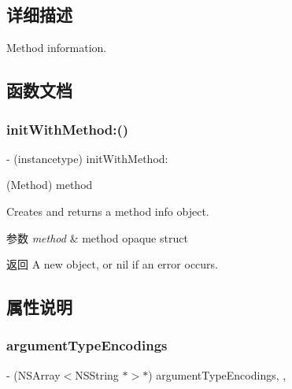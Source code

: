 \subsection{详细描述}
Method information. 

\subsection{函数文档}
\mbox{\label{interface_m_a_r_class_method_info_a691a3294f72bff4df6a3fc75f7c37e50}} 
\subsubsection{\texorpdfstring{init\+With\+Method\+:()}{initWithMethod:()}}
{\footnotesize\ttfamily -\/ (instancetype) init\+With\+Method\+: \begin{DoxyParamCaption}\item[{(Method)}]{method }\end{DoxyParamCaption}}

Creates and returns a method info object.


\begin{DoxyParams}{参数}
{\em method} & method opaque struct \\
\hline
\end{DoxyParams}
\begin{DoxyReturn}{返回}
A new object, or nil if an error occurs. 
\end{DoxyReturn}


\subsection{属性说明}
\mbox{\label{interface_m_a_r_class_method_info_a46229f193204a3be4f2b0c3d12a1e030}} 
\subsubsection{\texorpdfstring{argument\+Type\+Encodings}{argumentTypeEncodings}}
{\footnotesize\ttfamily -\/ (N\+S\+Array$<$N\+S\+String $\ast$$>$$\ast$) argument\+Type\+Encodings\hspace{0.3cm}{\ttfamily [read]}, {\ttfamily [nonatomic]}, {\ttfamily [strong]}}




